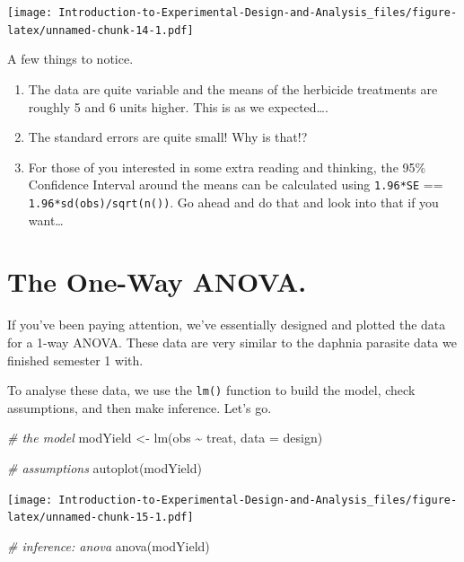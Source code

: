 \documentclass[
]{book}
\newenvironment{Shaded}{\begin{snugshade}}{\end{snugshade}}
\newcommand{\AttributeTok}[1]{\textcolor[rgb]{0.77,0.63,0.00}{#1}}
\newcommand{\CommentTok}[1]{\textcolor[rgb]{0.56,0.35,0.01}{\textit{#1}}}
\newcommand{\FunctionTok}[1]{\textcolor[rgb]{0.00,0.00,0.00}{#1}}
\newcommand{\NormalTok}[1]{#1}
\newcommand{\OtherTok}[1]{\textcolor[rgb]{0.56,0.35,0.01}{#1}}
\newcommand{\SpecialCharTok}[1]{\textcolor[rgb]{0.00,0.00,0.00}{#1}}
\providecommand{\tightlist}{%
  \setlength{\itemsep}{0pt}\setlength{\parskip}{0pt}}
\begin{document}
\texttt{[image: Introduction-to-Experimental-Design-and-Analysis\_files/figure-latex/unnamed-chunk-14-1.pdf]}

A few things to notice.

\begin{enumerate}
\def\labelenumi{\arabic{enumi}.}
\tightlist
\item
  The data are quite variable and the means of the herbicide treatments are roughly 5 and 6 units higher. This is as we expected\ldots.
\item
  The standard errors are quite small! Why is that!?
\item
  For those of you interested in some extra reading and thinking, the 95\% Confidence Interval around the means can be calculated using \texttt{1.96*SE} == \texttt{1.96*sd(obs)/sqrt(n())}. Go ahead and do that and look into that if you want\ldots{}
\end{enumerate}

\hypertarget{the-one-way-anova.}{%
\section{The One-Way ANOVA.}\label{the-one-way-anova.}}

If you've been paying attention, we've essentially designed and plotted the data for a 1-way ANOVA. These data are very similar to the daphnia parasite data we finished semester 1 with.

To analyse these data, we use the \texttt{lm()} function to build the model, check assumptions, and then make inference. Let's go.

\begin{Shaded}
\begin{Highlighting}[]
\CommentTok{\# the model}
\NormalTok{modYield }\OtherTok{\textless{}{-}} \FunctionTok{lm}\NormalTok{(obs }\SpecialCharTok{\textasciitilde{}}\NormalTok{ treat, }\AttributeTok{data =}\NormalTok{ design)}

\CommentTok{\# assumptions}
\FunctionTok{autoplot}\NormalTok{(modYield)}
\end{Highlighting}
\end{Shaded}

\texttt{[image: Introduction-to-Experimental-Design-and-Analysis\_files/figure-latex/unnamed-chunk-15-1.pdf]}

\begin{Shaded}
\begin{Highlighting}[]
\CommentTok{\# inference: anova}
\FunctionTok{anova}\NormalTok{(modYield)}
\end{Highlighting}
\end{Shaded}
\end{document}
